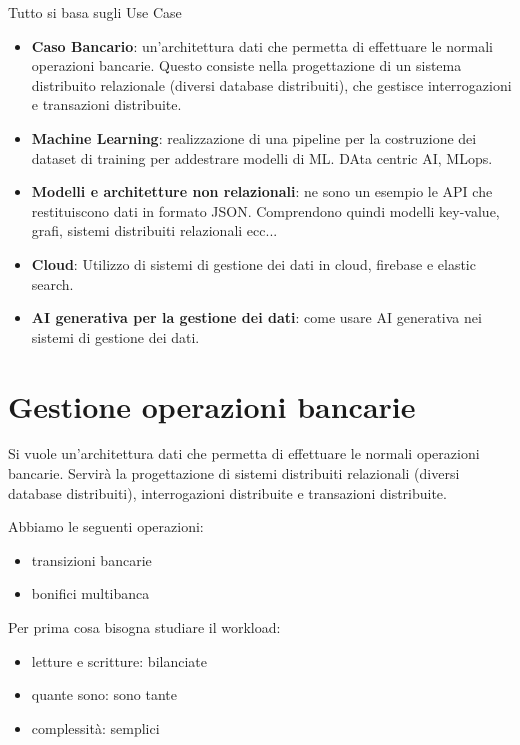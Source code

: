 Tutto si basa sugli Use Case
\begin{itemize}
      \item \textbf{Caso Bancario}: un'architettura dati che permetta di effettuare
            le normali operazioni bancarie. Questo consiste nella progettazione di
            un sistema distribuito relazionale (diversi database distribuiti), che
            gestisce interrogazioni e transazioni distribuite.
      \item \textbf{Machine Learning}: realizzazione di una pipeline per la
            costruzione dei dataset di training per addestrare modelli di ML.
            DAta centric AI, MLops.
      \item \textbf{Modelli e architetture non relazionali}: ne sono un esempio
            le API che restituiscono dati in formato JSON. Comprendono quindi
            modelli key-value, grafi, sistemi distribuiti relazionali ecc...
      \item \textbf{Cloud}: Utilizzo di sistemi di gestione dei dati in cloud,
            firebase e elastic search.
      \item \textbf{AI generativa per la gestione dei dati}: come usare AI
            generativa nei sistemi di gestione dei dati.
\end{itemize}

\section{Gestione operazioni bancarie}
Si vuole un'architettura dati che permetta di effettuare le normali operazioni
bancarie. Servirà la progettazione di sistemi distribuiti relazionali (diversi
database distribuiti), interrogazioni distribuite e transazioni distribuite.

Abbiamo le seguenti operazioni:
\begin{itemize}
      \item transizioni bancarie
      \item bonifici multibanca
\end{itemize}

Per prima cosa bisogna studiare il workload:
\begin{itemize}
      \item letture e scritture: bilanciate
      \item quante sono: sono tante
      \item complessità: semplici
\end{itemize}

